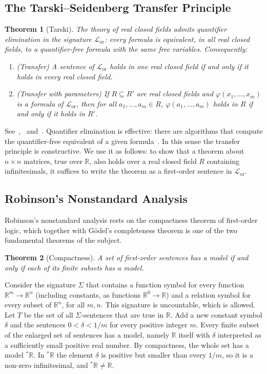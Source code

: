 \documentclass[12pt, a4paper]{report}
\theoremstyle{plain}
\newtheorem{theorem}{Theorem}[chapter]
\theoremstyle{definition}
\theoremstyle{remark}
\theoremstyle{plain}
\newcommand{\RR}{\mathbb{R}}
\begin{document}
\subsection{The Tarski--Seidenberg Transfer Principle}
\label{subsec:tarski}
\begin{theorem}[Tarski]\label{thm:tarski-transfer}
The theory of real closed fields admits quantifier elimination in the signature $\mathcal L_{\mathrm{or}}$: every formula is equivalent, in all real closed fields, to a quantifier-free formula with the same free variables. Consequently:
\begin{enumerate}
  \item \emph{(Transfer)} A sentence of $\mathcal L_{\mathrm{or}}$ holds in one real closed field if and only if it holds in every real closed field.
  \item \emph{(Transfer with parameters)} If $R\subseteq R'$ are real closed fields and $\varphi(x_1,\dots,x_m)$ is a formula of $\mathcal L_{\mathrm{or}}$, then for all $a_1,\dots,a_m\in R$, $\varphi(a_1,\dots,a_m)$ holds in $R$ if and only if it holds in $R'$.
\end{enumerate}
\end{theorem}
See~\cite{Tarski1951},~\cite[Proposition~5.2.3]{BochnakCosteRoy1998} and~\cite[Corollary~3.3.16]{Marker2002}. Quantifier elimination is effective: there are algorithms that compute the quantifier-free equivalent of a given formula~\cite{BasuPollackRoy2006}. In this sense the transfer principle is constructive. We use it as follows: to show that a theorem about $n\times n$ matrices, true over $\RR$, also holds over a real closed field $R$ containing infinitesimals, it suffices to write the theorem as a first-order sentence in $\mathcal L_{\mathrm{or}}$.

\subsection{Robinson's Nonstandard Analysis}
\label{subsec:robinson}
Robinson's nonstandard analysis rests on the compactness theorem of first-order logic, which together with G\"odel's completeness theorem is one of the two fundamental theorems of the subject.

\begin{theorem}[Compactness]\label{thm:compactness}
A set of first-order sentences has a model if and only if each of its finite subsets has a model.
\end{theorem}

Consider the signature $\Sigma$ that contains a function symbol for every function $\RR^m\to\RR^n$ (including constants, as functions $\RR^0\to\RR$) and a relation symbol for every subset of $\RR^n$, for all $m,n$. This signature is uncountable, which is allowed. Let $T$ be the set of all $\Sigma$-sentences that are true in $\RR$. Add a new constant symbol $\delta$ and the sentences $0<\delta<1/m$ for every positive integer $m$. Every finite subset of the enlarged set of sentences has a model, namely $\RR$ itself with $\delta$ interpreted as a sufficiently small positive real number. By compactness, the whole set has a model ${}^*\RR$. In ${}^*\RR$ the element $\delta$ is positive but smaller than every $1/m$, so it is a non-zero infinitesimal, and ${}^*\RR\neq\RR$.
\end{document}
